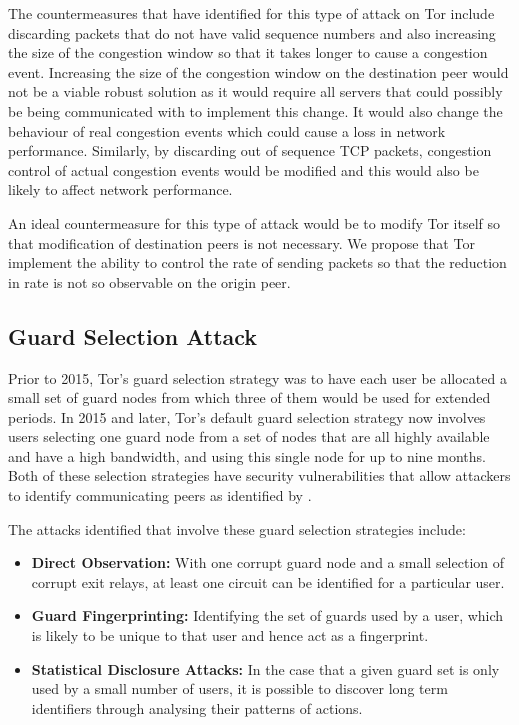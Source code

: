 \documentclass[9pt,technote]{IEEEtran}
\begin{document}
The countermeasures that \citeauthor{gilad2012spying} have identified for this type of attack on Tor include discarding packets that do not have valid sequence numbers and also increasing the size of the congestion window so that it takes longer to cause a congestion event. Increasing the size of the congestion window on the destination peer would not be a viable robust solution as it would require all servers that could possibly be being communicated with to implement this change. It would also change the behaviour of real congestion events which could cause a loss in network performance. Similarly, by discarding out of sequence TCP packets, congestion control of actual congestion events would be modified and this would also be likely to affect network performance. 

An ideal countermeasure for this type of attack would be to modify Tor itself so that modification of destination peers is not necessary. We propose that Tor implement the ability to control the rate of sending packets so that the reduction in rate is not so observable on the origin peer.

\subsection{Guard Selection Attack}
Prior to 2015, Tor's guard selection strategy was to have each user be allocated a small set of guard nodes from which three of them would be used for extended periods. In 2015 and later, Tor's default guard selection strategy now involves users selecting one guard node from a set of nodes that are all highly available and have a high bandwidth, and using this single node for up to nine months. Both of these selection strategies have security vulnerabilities that allow attackers to identify communicating peers as identified by \citeauthor{hayesguard}.

The attacks identified that involve these guard selection strategies include:
\begin{itemize}
\item \textbf{Direct Observation:} With one corrupt guard node and a small selection of corrupt exit relays, at least one circuit can be identified for a particular user.
\item \textbf{Guard Fingerprinting:} Identifying the set of guards used by a user, which is likely to be unique to that user and hence act as a fingerprint.
\item \textbf{Statistical Disclosure Attacks:} In the case that a given guard set is only used by a small number of users, it is possible to discover long term identifiers through analysing their patterns of actions.
\end{itemize}
\end{document}
